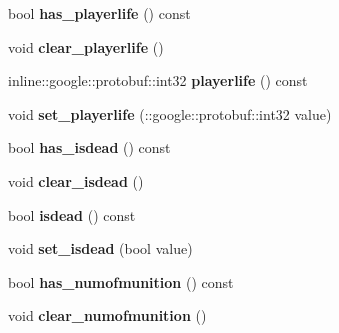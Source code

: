 \begin{DoxyCompactItemize}
\item 
\hypertarget{class_player_status_ad64bd569ef1e245fd8a014fcd8f04090}{bool {\bfseries has\-\_\-playerlife} () const }\label{class_player_status_ad64bd569ef1e245fd8a014fcd8f04090}

\item 
\hypertarget{class_player_status_a11691b2df689ecf3e2326e1b79c7abad}{void {\bfseries clear\-\_\-playerlife} ()}\label{class_player_status_a11691b2df689ecf3e2326e1b79c7abad}

\item 
\hypertarget{class_player_status_afa7a932b0873514837c8510653e5af8e}{inline\-::google\-::protobuf\-::int32 {\bfseries playerlife} () const }\label{class_player_status_afa7a932b0873514837c8510653e5af8e}

\item 
\hypertarget{class_player_status_a0df038d9ba5b74adf38613ebc31145bb}{void {\bfseries set\-\_\-playerlife} (\-::google\-::protobuf\-::int32 value)}\label{class_player_status_a0df038d9ba5b74adf38613ebc31145bb}

\item 
\hypertarget{class_player_status_ad9ced9478424750043236d941be787ac}{bool {\bfseries has\-\_\-isdead} () const }\label{class_player_status_ad9ced9478424750043236d941be787ac}

\item 
\hypertarget{class_player_status_a10a63552e37c6ed389f628b4f0b23e09}{void {\bfseries clear\-\_\-isdead} ()}\label{class_player_status_a10a63552e37c6ed389f628b4f0b23e09}

\item 
\hypertarget{class_player_status_ab2bab29066cc2dfe5a955ca97b8399df}{bool {\bfseries isdead} () const }\label{class_player_status_ab2bab29066cc2dfe5a955ca97b8399df}

\item 
\hypertarget{class_player_status_a5455c655f5e9ef116b8a9c0d01ae6bf9}{void {\bfseries set\-\_\-isdead} (bool value)}\label{class_player_status_a5455c655f5e9ef116b8a9c0d01ae6bf9}

\item 
\hypertarget{class_player_status_aedd0ba4ab7fc76b8a65e0fd5a23c2050}{bool {\bfseries has\-\_\-numofmunition} () const }\label{class_player_status_aedd0ba4ab7fc76b8a65e0fd5a23c2050}

\item 
\hypertarget{class_player_status_a6ba4592adf5601fb83dd30f4795782ae}{void {\bfseries clear\-\_\-numofmunition} ()}\label{class_player_status_a6ba4592adf5601fb83dd30f4795782ae}


\end{DoxyCompactItemize}
